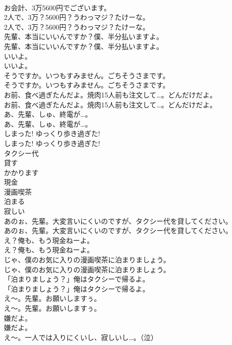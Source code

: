 \documentclass[8pt]{extreport}
\begin{document}
\begin{CJK}{UTF8}{min}
\\	お会計、3万5600円でございます。 
\\	2人で、3万？5600円？うわっマジ？たけーな。	
\\	2人で、3万？5600円？うわっマジ？たけーな。 
\\	先輩、本当にいいんですか？僕、半分払いますよ。	
\\	先輩、本当にいいんですか？僕、半分払いますよ。 
\\	いいよ。	
\\	いいよ。 
\\	そうですか。いつもすみません。ごちそうさまです。	
\\	そうですか。いつもすみません。ごちそうさまです。 
\\	お前、食べ過ぎたんだよ。焼肉15人前も注文して…。どんだけだよ。	
\\	お前、食べ過ぎたんだよ。焼肉15人前も注文して…。どんだけだよ。 
\\	あ、先輩、しゅ、終電が…。	
\\	あ、先輩、しゅ、終電が…。 
\\	しまった! ゆっくり歩き過ぎた!	
\\	しまった! ゆっくり歩き過ぎた! 
\\	タクシー代
\\	貸す
\\	かかります
\\	現金
\\	漫画喫茶
\\	泊まる
\\	寂しい
\\	あのぉ、先輩。大変言いにくいのですが、タクシー代を貸してください。	
\\	あのぉ、先輩。大変言いにくいのですが、タクシー代を貸してください。 
\\	え？俺も、もう現金ねーよ。	
\\	え？俺も、もう現金ねーよ。 
\\	じゃ、僕のお気に入りの漫画喫茶に泊まりましょう。	
\\	じゃ、僕のお気に入りの漫画喫茶に泊まりましょう。 
\\	「泊まりましょう？」俺はタクシーで帰るよ。	
\\	「泊まりましょう？」俺はタクシーで帰るよ。 
\\	え～。先輩。お願いしますぅ。	
\\	え～。先輩。お願いしますぅ。 
\\	嫌だよ。	
\\	嫌だよ。 
\\	え～。一人では入りにくいし、寂しいし…。（泣）	

\end{CJK}
\end{document}
